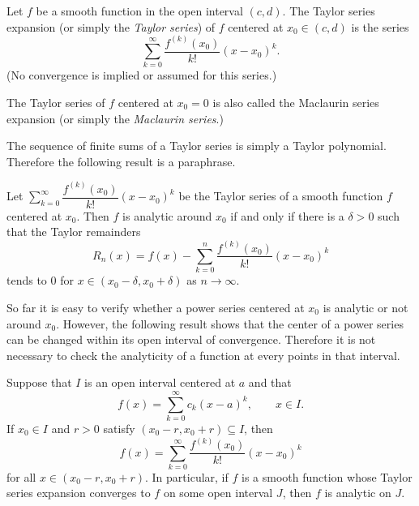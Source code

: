 \documentclass[11pt]{article}
\begin{document}
\begin{defn}
  Let $f$ be a smooth function in the open interval $(c,d)$.
  The \textsf{Taylor series expansion} (or simply the \textit{Taylor series}) of $f$ centered at $x_0 \in (c,d)$ is the series
  \[
    \sum_{k=0}^\infty \frac{ f^{(k)}(x_0) }{k!} (x - x_0)^k.
  \]
  (No convergence is implied or assumed for this series.)

  The Taylor series of $f$ centered at $x_0 = 0$ is also called the \textsf{Maclaurin series expansion} (or simply the \textit{Maclaurin series}.)
\end{defn}

The sequence of finite sums of a Taylor series is simply a Taylor polynomial.
Therefore the following result is a paraphrase.

\begin{prop}
  Let $\displaystyle \sum_{k=0}^\infty \dfrac{f^{(k)}(x_0)}{k!} (x - x_0)^k$ be the Taylor series of a smooth function $f$ centered at $x_0$.  
  Then $f$ is analytic around $x_0$ if and only if there is a $\delta > 0$ such that the Taylor remainders
  \[
    R_n(x) = f(x) - \sum_{k=0}^n \frac{ f^{(k)}(x_0) }{k!} (x-x_0)^k
  \]
  tends to $0$ for $x \in (x_0 - \delta, x_0 + \delta)$ as $n \to \infty$.
\end{prop}

So far it is easy to verify whether a power series centered at $x_0$ is analytic or not around $x_0$.
However, the following result shows that the center of a power series can be changed within its open interval of convergence.
Therefore it is not necessary to check the analyticity of a function at every points in that interval.

\begin{thm}
  Suppose that $I$ is an open interval centered at $a$ and that
  \[
    f(x) = \sum_{k=0}^\infty c_k (x-a)^k, \qquad x \in I.
  \]
  If $x_0 \in I$ and $r > 0$ satisfy $(x_0 - r, x_0 + r) \subseteq I$, then
  \[
    f(x) = \sum_{k=0}^\infty \frac{ f^{(k)}(x_0) }{ k! } (x - x_0)^k
  \]
  for all $x \in (x_0-r, x_0+r)$.
  In particular, if $f$ is a smooth function whose Taylor series expansion converges to $f$ on some open interval $J$, then $f$ is analytic on $J$.
\end{thm}
\end{document}
